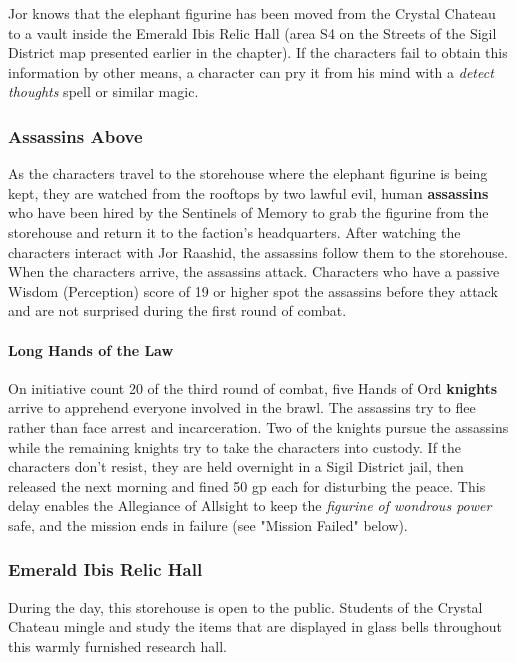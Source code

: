 \documentclass[a4paper, 11pt, bg=full, twocolumn, nooutline]{dndbook}
\begin{document}
Jor knows that the elephant figurine has been moved from the Crystal Chateau to a vault inside the Emerald Ibis Relic Hall (area S4 on the Streets of the Sigil District map presented earlier in the chapter). If the characters fail to obtain this information by other means, a character can pry it from his mind with a \textit{detect thoughts} spell or similar magic.

\subsubsection{Assassins Above}

As the characters travel to the storehouse where the elephant figurine is being kept, they are watched from the rooftops by two lawful evil, human \textbf{assassins} who have been hired by the Sentinels of Memory to grab the figurine from the storehouse and return it to the faction's headquarters. After watching the characters interact with Jor Raashid, the assassins follow them to the storehouse. When the characters arrive, the assassins attack. Characters who have a passive Wisdom (Perception) score of 19 or higher spot the assassins before they attack and are not surprised during the first round of combat.

\paragraph{Long Hands of the Law}

On initiative count 20 of the third round of combat, five Hands of Ord \textbf{knights} arrive to apprehend everyone involved in the brawl. The assassins try to flee rather than face arrest and incarceration. Two of the knights pursue the assassins while the remaining knights try to take the characters into custody. If the characters don't resist, they are held overnight in a Sigil District jail, then released the next morning and fined 50 gp each for disturbing the peace. This delay enables the Allegiance of Allsight to keep the \textit{figurine of wondrous power} safe, and the mission ends in failure (see "Mission Failed" below).

\subsubsection{Emerald Ibis Relic Hall}

During the day, this storehouse is open to the public. Students of the Crystal Chateau mingle and study the items that are displayed in glass bells throughout this warmly furnished research hall.
\end{document}
